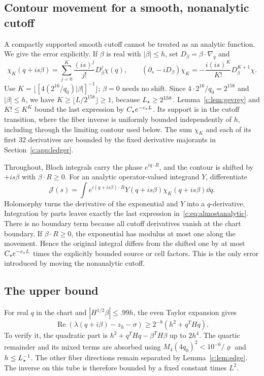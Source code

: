 \subsection{Contour movement for a smooth, nonanalytic cutoff}
A compactly supported smooth cutoff cannot be treated as an analytic
function. We give the error explicitly. If $\beta$ is real with
$|\beta|\le h$, set $D_\beta=\beta\cdot\nabla_q$ and
\begin{equation}
 \chi_K(q+is\beta)=\sum_{j=0}^K\frac{(is)^j}{j!}D_\beta^j\chi(q),
 \qquad
 (\partial_s-iD_\beta)\chi_K
 =-\frac{i(is)^K}{K!}D_\beta^{K+1}\chi.               \label{c:eq:almostanalytic}
\end{equation}
Use $K=\lfloor[4(2^{16}/q_0)|\beta|]^{-1}\rfloor$; $\beta=0$ needs no
shift. Since $4\cdot2^{16}/q_0=2^{158}$ and $|\beta|\le h$, we have
$K\ge\lfloor L/2^{158}\rfloor\ge1$, because $L_\star\ge2^{158}$.
Lemma~\ref{c:lem:gevrey} and $K!\le K^K$ bound the last expression by
$C_\star e^{-c_\star L}$. Its support is in the cutoff transition, where the
fiber inverse is uniformly bounded independently of $h$, including
through the limiting contour used below. The sum $\chi_K$ and each
of its first 32 derivatives are bounded by the fixed derivative
majorants in Section~\ref{c:app:ledger}.

Throughout, Bloch integrals carry the phase $e^{iq\cdot R}$, and the
contour is shifted by $+is\beta$ with $\beta\cdot R\ge0$.
For an analytic operator-valued integrand $Y$, differentiate
\[
 \mathcal J(s)=\int e^{i(q+is\beta)\cdot R}
       Y(q+is\beta)\chi_K(q+is\beta)\dd q.
\]
Holomorphy turns the derivative of the exponential and $Y$ into a
$q$-derivative. Integration by parts leaves exactly the last expression
in~\eqref{c:eq:almostanalytic}. There is no boundary term because all
cutoff derivatives vanish at the chart boundary. If $\beta\cdot R\ge0$,
the exponential has modulus at most one along the movement. Hence the
original integral differs from the shifted one by at most
$C_\star e^{-c_\star L}$ times the explicitly bounded source or cell factors.
This is the only error introduced by moving the nonanalytic cutoff.

\subsection{The upper bound}
For real $q$ in the chart and
$|H^{1/2}\beta|\le .99h$, the even Taylor expansion gives
\begin{equation}
 \operatorname{Re}(\lambda(q+i\beta)-z_h-\sigma)
 \ge 2^{-8}(h^2+q^THq).                              \label{c:eq:tube}
\end{equation}
To verify it, the quadratic part is
$h^2+q^THq-\beta^TH\beta$ up to $2h^4$.
The quartic remainder and its mixed terms are absorbed using
$M_4(4q_0)^2<10^{-6}/\varrho$ and $h\le L_\star^{-1}$.
The other fiber directions remain separated by Lemma~\ref{c:lem:edge}.
The inverse on this tube is therefore bounded by a fixed constant times
$L^2$.

